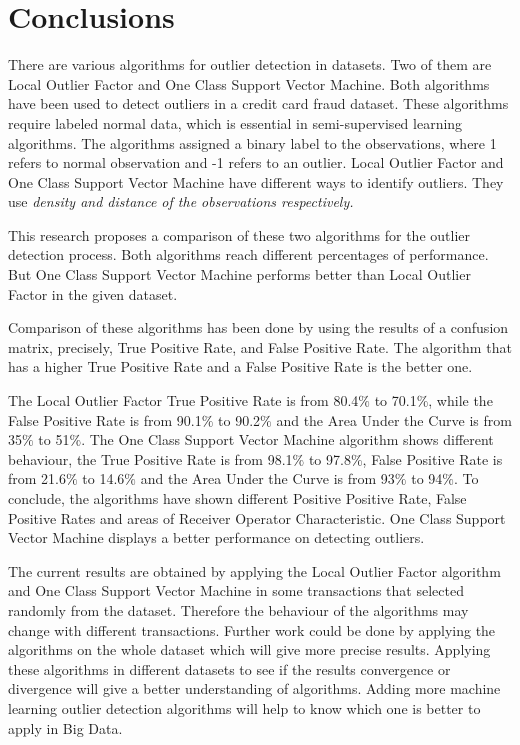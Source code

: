 \chapter{Conclusions} \label{Conclusion}
There are various algorithms for outlier detection in datasets. Two of them are Local Outlier Factor and One Class Support Vector Machine. Both algorithms have been used to detect outliers in a credit card fraud dataset. These algorithms require labeled normal data, which is essential in semi-supervised learning algorithms. The algorithms assigned a binary label to the observations, where 1 refers to normal observation and -1 refers to an outlier. Local Outlier Factor and One Class Support Vector Machine have different ways to identify outliers. They use \em{density} and \em{distance} of the observations respectively.

This research proposes a comparison of these two algorithms for the outlier detection process. Both algorithms reach different percentages of performance. But One Class Support Vector Machine performs better than Local Outlier Factor in the given dataset.

Comparison of these algorithms has been done by using the results of a confusion matrix, precisely, True Positive Rate, and False Positive Rate. The algorithm that has a higher True Positive Rate and a False Positive Rate is the better one.

The Local Outlier Factor True Positive Rate is from 80.4$\%$ to 70.1$\%$, while the False Positive Rate is from 90.1$\%$ to 90.2$\%$ and the Area Under the Curve is from 35$\%$ to 51$\%$. The One Class Support Vector Machine algorithm shows different behaviour, the True Positive Rate is from 98.1$\%$ to 97.8$\%$, False Positive Rate is from 21.6$\%$ to 14.6$\%$ and the Area Under the Curve is from 93$\%$ to 94$\%$. To conclude, the algorithms have shown different Positive Positive Rate, False Positive Rates and areas of Receiver Operator Characteristic. One Class Support Vector Machine displays a better performance on detecting outliers.

The current results are obtained by applying the Local Outlier Factor algorithm and One Class Support Vector Machine in some transactions that selected randomly from the dataset. Therefore the behaviour of the algorithms may change with different transactions. Further work could be done by applying the algorithms on the whole dataset which will give more precise results. Applying these algorithms in different datasets to see if the results convergence or divergence will give a better understanding of algorithms. Adding more machine learning outlier detection algorithms will help to know which one is better to apply in Big Data.  









